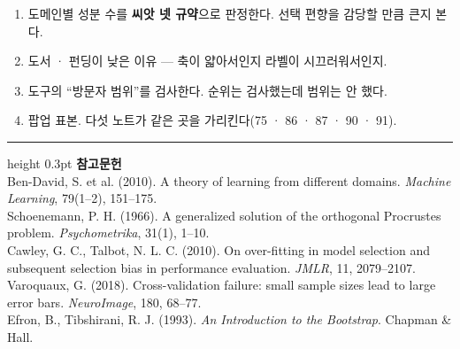 \documentclass[10pt]{article}
\begin{document}
\begin{enumerate}[leftmargin=1.3em,itemsep=0.15em]
\item 도메인별 성분 수를 \textbf{씨앗 넷 규약}으로 판정한다. 선택 편향을
      감당할 만큼 큰지 본다.
\item 도서 · 펀딩이 낮은 이유 --- 축이 얇아서인지 라벨이 시끄러워서인지.
\item 도구의 ``방문자 범위''를 검사한다. 순위는 검사했는데 범위는 안 했다.
\item 팝업 표본. 다섯 노트가 같은 곳을 가리킨다(75 · 86 · 87 · 90 · 91).
\end{enumerate}

\vspace{0.6em}
\hrule height 0.3pt
\vspace{0.5em}
{\footnotesize
\textbf{참고문헌}\\[0.3em]
Ben-David, S. et al. (2010). A theory of learning from different domains.
\emph{Machine Learning}, 79(1--2), 151--175.\\[0.15em]
Schoenemann, P. H. (1966). A generalized solution of the orthogonal Procrustes
problem. \emph{Psychometrika}, 31(1), 1--10.\\[0.15em]
Cawley, G. C., Talbot, N. L. C. (2010). On over-fitting in model selection and
subsequent selection bias in performance evaluation. \emph{JMLR}, 11, 2079--2107.\\[0.15em]
Varoquaux, G. (2018). Cross-validation failure: small sample sizes lead to large
error bars. \emph{NeuroImage}, 180, 68--77.\\[0.15em]
Efron, B., Tibshirani, R. J. (1993). \emph{An Introduction to the Bootstrap}.
Chapman \& Hall.
}
\end{document}
